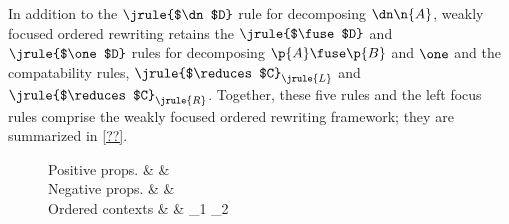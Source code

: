 In addition to the $\jrule{$\dn$D}$ rule for decomposing $\dn \n{A}$, weakly focused ordered rewriting retains the $\jrule{$\fuse$D}$ and $\jrule{$\one$D}$ rules for decomposing $\p{A} \fuse \p{B}$ and $\one$ and the compatability rules, $\jrule{$\reduces$C}_{\jrule{L}}$ and $\jrule{$\reduces$C}_{\jrule{R}}$.
Together, these five rules and the left focus rules comprise the weakly focused ordered rewriting framework; they are summarized in \cref{??}.
%
\begin{figure}
  \begin{syntax*}
    Positive props. &
       & \p{\alpha} \mid {} \fuse {} \mid \one \mid \dn {}
    \\
    Negative props. &
       & \n{\alpha} \mid
                 \limp {} \mid {} \pmir {} \mid %
                 \with {} \mid \top \mid \up {}
    \\
    Ordered contexts &
      \octx & \octx_1 \oc \octx_2 \mid \octxe \mid {}
  \end{syntax*}


\end{figure}
